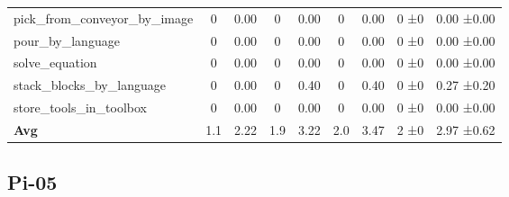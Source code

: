 \begin{table}[H]
{\begin{tabular}{l|c|c|c|c|c|c|c|c}
pick\_from\_conveyor\_by\_image & 0 & 0.00 & 0 & 0.00 & 0 & 0.00 & 0 ±0 & 0.00 ±0.00 \\
pour\_by\_language & 0 & 0.00 & 0 & 0.00 & 0 & 0.00 & 0 ±0 & 0.00 ±0.00 \\
solve\_equation & 0 & 0.00 & 0 & 0.00 & 0 & 0.00 & 0 ±0 & 0.00 ±0.00 \\
stack\_blocks\_by\_language & 0 & 0.00 & 0 & 0.40 & 0 & 0.40 & 0 ±0 & 0.27 ±0.20 \\
store\_tools\_in\_toolbox & 0 & 0.00 & 0 & 0.00 & 0 & 0.00 & 0 ±0 & 0.00 ±0.00 \\
\hline
\textbf{Avg} & 1.1 & 2.22 & 1.9 & 3.22 & 2.0 & 3.47 & 2 ±0 & 2.97 ±0.62 \\
\hline
\end{tabular}
}
\end{table}
\subsection{Pi-05}
\label{part:pi_05}

